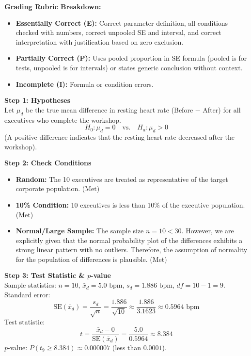 \begin{frqrubricbox}
\textbf{Grading Rubric Breakdown:}\\
\begin{itemize}
  \item \textbf{Essentially Correct (E):} Correct parameter definition, all conditions checked with numbers, correct unpooled SE and interval, and correct interpretation with justification based on zero exclusion.
  \item \textbf{Partially Correct (P):} Uses pooled proportion in SE formula (pooled is for tests, unpooled is for intervals) or states generic conclusion without context.
  \item \textbf{Incomplete (I):} Formula or condition errors.
\end{itemize}
\end{frqrubricbox}

\begin{frqrubricbox}
\textbf{Step 1: Hypotheses}\\
Let $\mu_d$ be the true mean difference in resting heart rate (Before $-$ After) for all executives who complete the workshop.
\[ H_0: \mu_d = 0 \quad \text{vs.} \quad H_a: \mu_d > 0 \]
(A positive difference indicates that the resting heart rate decreased after the workshop).

\textbf{Step 2: Check Conditions}\\
\begin{itemize}
  \item \textbf{Random:} The 10 executives are treated as representative of the target corporate population. (Met)
  \item \textbf{10\% Condition:} 10 executives is less than 10\% of the executive population. (Met)
  \item \textbf{Normal/Large Sample:} The sample size $n = 10 < 30$. However, we are explicitly given that the normal probability plot of the differences exhibits a strong linear pattern with no outliers. Therefore, the assumption of normality for the population of differences is plausible. (Met)
\end{itemize}

\textbf{Step 3: Test Statistic \& $p$-value}\\
Sample statistics: $n = 10$, $\bar{x}_d = 5.0\text{ bpm}$, $s_d = 1.886\text{ bpm}$, $df = 10 - 1 = 9$.
Standard error:
\[ \text{SE}(\bar{x}_d) = \frac{s_d}{\sqrt{n}} = \frac{1.886}{\sqrt{10}} \approx \frac{1.886}{3.1623} \approx 0.5964\text{ bpm} \]
Test statistic:
\[ t = \frac{\bar{x}_d - 0}{\text{SE}(\bar{x}_d)} = \frac{5.0}{0.5964} \approx 8.384 \]
$p$-value: $P(t_9 \ge 8.384) \approx 0.000007$ (less than $0.0001$).


\end{frqrubricbox}
